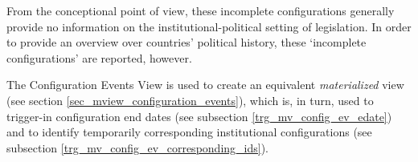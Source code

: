 From the conceptional point of view, these incomplete configurations generally provide no information on the institutional-political setting of legislation. 
In order to provide an overview over countries' political history, these `incomplete configurations' are reported, however.

The Configuration Events View is used to create an equivalent {\em materialized} view (see section \ref{sec_mview_configuration_events}), which is, in turn, used to trigger-in configuration end dates (see subsection \ref{trg_mv_config_ev_edate}) and to identify temporarily corresponding institutional configurations (see subsection \ref{trg_mv_config_ev_corresponding_ids}).